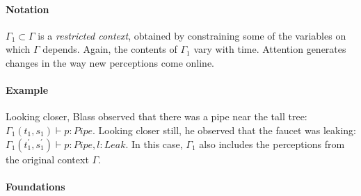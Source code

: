 \paragraph{\textbf{\upshape Notation}}

 $\Gamma_1 \subset \Gamma$ is a \emph{restricted context}, obtained by
 constraining some of the variables on which $\Gamma$ depends.  Again,
 the contents of $\Gamma_1$ vary with time.  Attention generates
 changes in the way new perceptions come online.

 \paragraph{\textbf{\upshape Example}} Looking closer, Blass observed that there was a pipe near the tall tree:
  $\Gamma_1(t_1,s_1)\vdash p:\mathit{Pipe}$.  Looking closer still,
 he observed that the faucet was leaking:
 $\Gamma_1(t_1^\prime,s_1^\prime)\vdash p:\mathit{Pipe}, l:\mathit{Leak}$.
 In this case, $\Gamma_1$ also includes the perceptions from the original context $\Gamma$.

 \begin{center}
 \asterism
 \end{center}



 \paragraph{\textbf{\upshape Foundations}}
                                         
